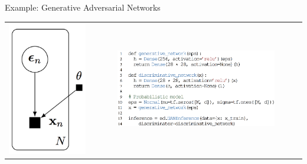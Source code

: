 \documentclass[final]{beamer}
\begin{document}
\begin{frame}[t]
\begin{columns}[t]
\begin{column}{\onecolwid}
\begin{block}{Example: Generative Adversarial Networks}
\begin{tabular}{cc}
\hspace{-1.5em}
\includegraphics{img/gan_graph.png}
&
\includegraphics[width=0.77\textwidth]{img/gan_code.png}
\end{tabular}
\vspace{-2ex}
\end{block}


\end{column}
\end{columns}
\end{frame}
\end{document}
